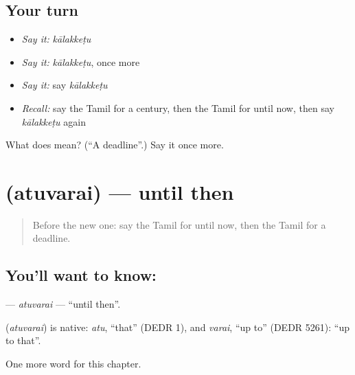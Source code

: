 \subsection*{Your turn}
\begin{itemize}
\raggedright
  \item \emph{Say it:} \emph{kālakkeṭu}
  \item \emph{Say it:} \emph{kālakkeṭu}, once more
  \item \emph{Say it:} say \emph{kālakkeṭu}
  \item \emph{Recall:} say the Tamil for a century, then the Tamil for until now, then say \emph{kālakkeṭu} again
\end{itemize}

\begin{tcolorbox}[breakable,colback=teal!4,colframe=teal!35!black,title={Before you move on}]
What does  mean? (\textquotedblleft{}A deadline\textquotedblright{}.) Say it once more.
\end{tcolorbox}
\section[\texorpdfstring{\ta{அதுவரை} (atuvarai)}{அதுவரை (atuvarai)}]{ (atuvarai) — until then}

\label{lesson:TA-C203-atuvarai}



\begin{quote}
Before the new one: say the Tamil for until now, then the Tamil for a deadline.
\end{quote}

\subsection*{You'll want to know: }
\textbf{} — \emph{atuvarai} — \textquotedblleft{}until then\textquotedblright{}.

\begin{cousinweb}
\textbf{} (\emph{atuvarai}) is native: \emph{atu}, \textquotedblleft{}that\textquotedblright{} (DEDR 1), and \emph{varai}, \textquotedblleft{}up to\textquotedblright{} (DEDR 5261): \textquotedblleft{}up to that\textquotedblright{}.
\end{cousinweb}

\begin{grammarlens}[title={What you've built}]
One more word for this chapter.
\end{grammarlens}

